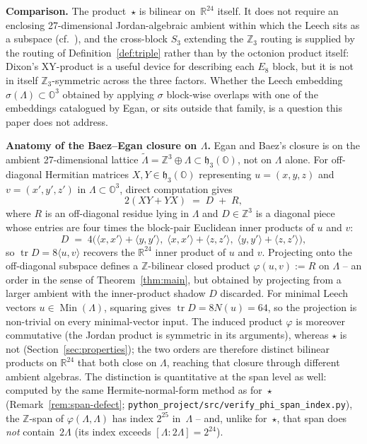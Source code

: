 \documentclass[twoside,english]{paper}
\numberwithin{equation}{section}
\numberwithin{figure}{section}
\theoremstyle{definition}
\theoremstyle{remark}
\newcommand{\OO}{\mathbb{O}}          %
\newcommand{\RR}{\mathbb{R}}
\newcommand{\ZZ}{\mathbb{Z}}
\newcommand{\LL}{\Lambda}             %
\newcommand{\Nrm}{N}                  %
\begin{document}
\textbf{Comparison.}  The product~$\star$ is bilinear on~$\RR^{24}$
itself.  It does not require an enclosing 27-dimensional
Jordan-algebraic ambient within which the Leech sits as a subspace
(cf.~\cite{Baez2014}), and the cross-block $S_3$ extending the
$\ZZ_3$ routing is supplied by the routing of
Definition~\ref{def:triple} rather than by the octonion product
itself: Dixon's XY-product
\cite{Dixon1995, Dixon2010} is a useful device for describing each
$E_8$ block, but it is not in itself $\ZZ_3$-symmetric across the
three factors.  Whether the Leech embedding $\sigma(\LL) \subset
\OO^3$ obtained by applying $\sigma$ block-wise overlaps with one of
the embeddings catalogued by Egan, or sits outside that family, is
a question this paper does not address.

\textbf{Anatomy of the Baez--Egan closure on $\LL$.}  Egan and
Baez's closure is on the ambient 27-dimensional lattice
$\widetilde{\LL} = \ZZ^3 \oplus \LL \subset \mathfrak{h}_3(\OO)$,
not on $\LL$ alone.  For off-diagonal Hermitian matrices $X, Y \in
\mathfrak{h}_3(\OO)$ representing $u = (x,y,z)$ and $v = (x',y',z')$
in $\LL \subset \OO^3$, direct computation gives
\[
  2(XY + YX) \;=\; D \;+\; R,
\]
where $R$ is an off-diagonal residue lying in $\LL$ and $D \in
\ZZ^3$ is a diagonal piece whose entries are four times the
block-pair Euclidean inner products of $u$ and $v$:
\[
  D \;=\; 4\bigl(\langle x, x'\rangle + \langle y, y'\rangle,\;
                  \langle x, x'\rangle + \langle z, z'\rangle,\;
                  \langle y, y'\rangle + \langle z, z'\rangle\bigr),
\]
so $\operatorname{tr} D = 8 \langle u, v\rangle$ recovers the
$\RR^{24}$ inner product of $u$ and $v$.  Projecting onto the
off-diagonal subspace defines a $\ZZ$-bilinear closed product
$\varphi(u, v) := R$ on $\LL$ -- an order in the sense of
Theorem~\ref{thm:main}, but obtained by projecting from a larger
ambient with the inner-product shadow $D$ discarded.  For minimal
Leech vectors $u \in \operatorname{Min}(\LL)$, squaring gives
$\operatorname{tr} D = 8\Nrm(u) = 64$, so the projection is
non-trivial on every minimal-vector input.  The induced product
$\varphi$ is moreover commutative (the Jordan product is symmetric
in its arguments), whereas $\star$ is not
(Section~\ref{sec:properties}); the two orders are therefore
distinct bilinear products on $\RR^{24}$ that both close on $\LL$,
reaching that closure through different ambient algebras.  The
distinction is quantitative at the span level as well: computed by
the same Hermite-normal-form method as for~$\star$
(Remark~\ref{rem:span-defect};
\texttt{python\_project/src/verify\_phi\_span\_index.py}), the
$\ZZ$-span of $\varphi(\LL, \LL)$ has index $2^{25}$ in~$\LL$ --
and, unlike for~$\star$, that span does \emph{not} contain~$2\LL$
(its index exceeds $[\LL : 2\LL] = 2^{24}$).
\end{document}
